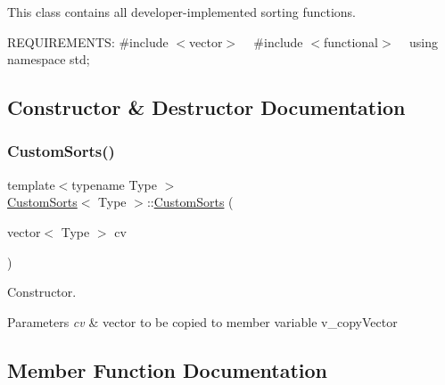 This class contains all developer-\/implemented sorting functions. 

\begin{DoxyParagraph}{R\+E\+Q\+U\+I\+R\+E\+M\+E\+N\+TS\+:}
\#include $<$vector$>$ ~\newline
 \#include $<$functional$>$ ~\newline
 using namespace std; 
\end{DoxyParagraph}


\subsection{Constructor \& Destructor Documentation}
\mbox{\label{class_custom_sorts_a6605d8169cb352d9f71577eb4fff6e8d}} 
\subsubsection{\texorpdfstring{CustomSorts()}{CustomSorts()}}
{\footnotesize\ttfamily template$<$typename Type $>$ \\
\mbox{\hyperlink{class_custom_sorts}{Custom\+Sorts}}$<$ Type $>$\+::\mbox{\hyperlink{class_custom_sorts}{Custom\+Sorts}} (\begin{DoxyParamCaption}\item[{vector$<$ Type $>$}]{cv }\end{DoxyParamCaption})\hspace{0.3cm}{\ttfamily [inline]}}



Constructor. 


\begin{DoxyParams}{Parameters}
{\em cv} & vector to be copied to member variable v\+\_\+copy\+Vector \\
\hline
\end{DoxyParams}


\subsection{Member Function Documentation}
\mbox{\label{class_custom_sorts_af4fd734d9de0903b53fc53ef007d1aa6}} 

